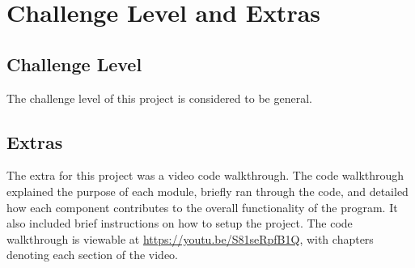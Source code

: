 \documentclass{article}
\begin{document}
\section{Challenge Level and Extras}

\subsection{Challenge Level}

The challenge level of this project is considered to be general.

\subsection{Extras}

The extra for this project was a video code walkthrough. The code walkthrough
explained the purpose of each module, briefly ran through the code, and
detailed how each component contributes to the overall functionality of the
program. It also included brief instructions on how to setup the project.
The code walkthrough is viewable at \url{https://youtu.be/S81seRpfB1Q}, with
chapters denoting each section of the video.






\end{document}
